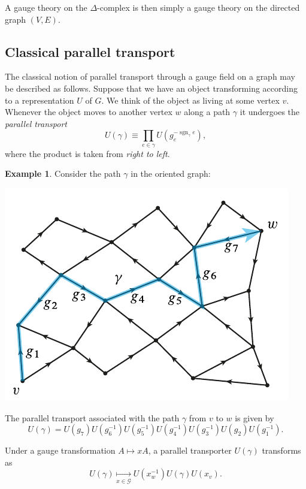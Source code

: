 \documentclass[12pt]{amsart}
\newcommand{\sgn}{\operatorname{sgn}}
\theoremstyle{definition}
\newtheorem{example}[theorem]{Example}
\theoremstyle{remark}
\numberwithin{equation}{section}
\begin{document}
A gauge theory on the $\Delta$-complex is then simply a gauge theory on the directed graph $(V,E)$.

\subsection{Classical parallel transport}
The classical notion of parallel transport through a gauge field on a graph may be described as follows. Suppose that we have an object transforming according to a representation $U$ of $G$. We think of the object as living at some vertex $v$. Whenever the object moves to another vertex $w$ along a path $\gamma$ it undergoes the \emph{parallel transport}  
\begin{equation}\label{eq:ugamma}
	U(\gamma) \equiv \prod_{e\in \gamma} U(g_{e}^{-\sgn_\gamma{e}}),
\end{equation}
where the product is taken from \emph{right to left}.

\begin{example}
Consider the path $\gamma$ in the oriented graph:
\begin{center}
	\includegraphics{paralleltx.pdf}
\end{center}
The parallel transport associated with the path $\gamma$ from $v$ to $w$ is given by
\begin{equation}
	U(\gamma) = U(g_{7})U(g_{6}^{-1})U(g_{5}^{-1})U(g_{4}^{-1})U(g_{3}^{-1})U(g_{2}) U(g_{1}^{-1}).
\end{equation}
\end{example}
Under a gauge transformation $A \mapsto xA$, a parallel transporter $U(\gamma)$ transforms as
\begin{equation}
	U(\gamma) \underset{x\in \mathcal{G}}{\longmapsto} U(x_{w}^{-1}) U(\gamma) U(x_{v}).
\end{equation}
\end{document}
